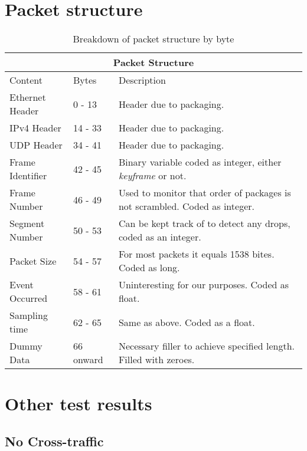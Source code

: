 \chapter{Packet structure}
\thispagestyle{empty}%
\begin{table}[htbp]
\break
\setlength{\arrayrulewidth}{1mm}
\setlength{\tabcolsep}{12pt}
\renewcommand{\arraystretch}{1.5}
 {
\begin{tabular}{ |p{3cm}|p{2cm}|p{8cm}|  }
\hline
\multicolumn{3}{|c|}{Packet Structure} \\
\hline
Content & Bytes & Description \\
\hline
Ethernet Header & 0 - 13 & Header due to packaging. \\
IPv4 Header & 14 - 33 & Header due to packaging. \\
UDP Header & 34 - 41 & Header due to packaging. \\
Frame Identifier & 42 - 45 & Binary variable coded as integer, either \textit{keyframe} or not. \\
Frame Number & 46 - 49 & Used to monitor that order of packages is not scrambled. Coded as integer. \\
Segment Number & 50 - 53 & Can be kept track of to detect any drops, coded as an integer. \\
Packet Size & 54 - 57 & For most packets it equals 1538 bites. Coded as long. \\
Event Occurred & 58 - 61 & Uninteresting for our purposes. Coded as float. \\
Sampling time & 62 - 65 & Same as above. Coded as a float. \\
Dummy Data & 66 onward & Necessary filler to achieve specified length. Filled with zeroes. \\
\hline
\end{tabular}
}
\caption{Breakdown of packet structure by byte}
\end{table}

\chapter{Other test results}
\thispagestyle{empty}

\clearpage

\section{No Cross-traffic}

